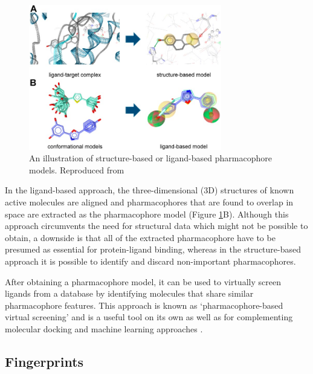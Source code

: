 \begin{figure}[htbp!] 
    \centering    
    \includegraphics[width=0.75\textwidth]{Chapters/Background/Figs/pharmacophore_models.png}
    \caption{An illustration of structure-based or ligand-based pharmacophore models. Reproduced from \cite{Kaserer2015PharmacophoreReview}}
    \label{fig:pharmacophore_models}
\end{figure}

In the ligand-based approach, the three-dimensional (3D) structures of known active molecules are aligned and pharmacophores that are found to overlap in space are extracted as the pharmacophore model (Figure \ref{fig:pharmacophore_models}B). Although this approach circumvents the need for structural data which might not be possible to obtain, a downside is that all of the extracted pharmacophore have to be presumed as essential for protein-ligand binding, whereas in the structure-based approach it is possible to identify and discard non-important pharmacophores.

After obtaining a pharmacophore model, it can be used to virtually screen ligands from a database by identifying molecules that share similar pharmacophore features. This approach is known as `pharmacophore-based virtual screening' and is a useful tool on its own as well as for complementing molecular docking and machine learning approaches \cite{Dixon2006pharmacophore, Temml2014pharmacophore, Pradeepkiran2019pharmacophor, Pal2019pharmacophore}.


\subsection{Fingerprints} \label{subsec:fingerprints}

